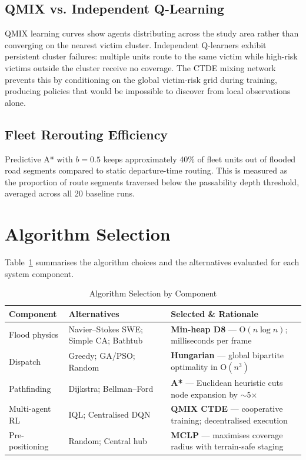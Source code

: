 \documentclass[conference]{IEEEtran}
\begin{document}
\subsection{QMIX vs. Independent Q-Learning}

QMIX learning curves show agents distributing across the study area rather
than converging on the nearest victim cluster.
Independent Q-learners exhibit persistent cluster failures: multiple units
route to the same victim while high-risk victims outside the cluster receive
no coverage.
The CTDE mixing network prevents this by conditioning on the global victim-risk
grid during training, producing policies that would be impossible to discover
from local observations alone.

\subsection{Fleet Rerouting Efficiency}

Predictive A* with $b=0.5$ keeps approximately 40\% of fleet units out of
flooded road segments compared to static departure-time routing.
This is measured as the proportion of route segments traversed below the
passability depth threshold, averaged across all 20 baseline runs.

\section{Algorithm Selection}
\label{sec:algo}

Table~\ref{tab:algo} summarises the algorithm choices and the alternatives
evaluated for each system component.

\begin{table}[!t]
  \renewcommand{\arraystretch}{1.2}
  \caption{Algorithm Selection by Component}
  \label{tab:algo}
  \centering
  \begin{tabular}{p{1.4cm}p{2.2cm}p{4.0cm}}
    \toprule
    \textbf{Component} & \textbf{Alternatives} & \textbf{Selected \& Rationale} \\
    \midrule
    Flood physics &
      Navier--Stokes SWE; Simple CA; Bathtub &
      \textbf{Min-heap D8} --- O$(n\log n)$; milliseconds per frame \\[3pt]
    Dispatch &
      Greedy; GA/PSO; Random &
      \textbf{Hungarian} --- global bipartite optimality in O$(n^3)$ \\[3pt]
    Pathfinding &
      Dijkstra; Bellman--Ford &
      \textbf{A*} --- Euclidean heuristic cuts node expansion by $\sim$5$\times$ \\[3pt]
    Multi-agent RL &
      IQL; Centralised DQN &
      \textbf{QMIX CTDE} --- cooperative training; decentralised execution \\[3pt]
    Pre-positioning &
      Random; Central hub &
      \textbf{MCLP} --- maximises coverage radius with terrain-safe staging \\
    \bottomrule
  \end{tabular}
\end{table}
\end{document}
